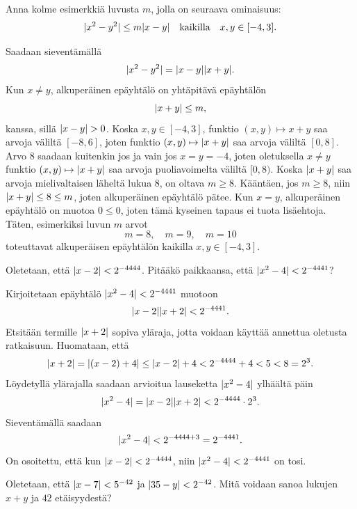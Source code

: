 \documentclass[12pt,a4paper]{article}
\begin{document}
\begin{exercise}
Anna kolme esimerkkiä luvusta \(m\), jolla on seuraava ominaisuus:
\begin{equation*}
\lvert x^2 - y^2\rvert \leq m\lvert x - y\rvert \quad \text{kaikilla} \quad x,y \in [-4, 3].
\end{equation*}
\end{exercise}

\begin{solution}
Saadaan sieventämällä
\[\lvert x^2 - y^2\rvert = \lvert x - y\rvert\lvert x + y\rvert.\]
Kun \(x \neq y\), alkuperäinen epäyhtälö on yhtäpitävä epäyhtälön
\[\lvert x + y\rvert \leq m,\]
kanssa, sillä \(\lvert x - y\rvert > 0\). Koska \(x,y \in [-4,
3]\), funktio \((x, y) \mapsto x + y\)
saa arvoja väliltä \([-8, 6]\), joten funktio
\((x, y) \mapsto \lvert x + y\rvert\) saa arvoja väliltä \([0, 8]\). Arvo \(8\)
saadaan kuitenkin jos ja vain jos \(x = y = -4\), joten oletuksella
\(x \neq y\) funktio \((x, y) \mapsto \lvert x + y\rvert\) saa arvoja puoliavoimelta
väliltä \([0, 8)\). Koska \(\lvert x + y\rvert\) saa arvoja mielivaltaisen läheltä
lukua 8, on oltava \(m \geq 8\).
Kääntäen, jos \(m \geq 8\), niin \(\lvert x + y\rvert \leq 8 \leq m\), joten
alkuperäinen epäyhtälö pätee. Kun \(x = y\), alkuperäinen epäyhtälö
on muotoa \(0 \leq 0\), joten tämä kyseinen tapaus ei tuota lisäehtoja.
Täten, esimerkiksi luvun \(m\) arvot \[m = 8, \quad m = 9, \quad m = 10\]
toteuttavat alkuperäisen epäyhtälön kaikilla \(x,y \in [-4, 3]\).
\end{solution}

\begin{exercise}
Oletetaan, että \(\lvert x - 2\rvert < 2^{-4444}\). Pitääkö paikkaansa, että
\(\lvert x^2 - 4\rvert < 2^{-4441}\)?
\end{exercise}

\begin{solution}
Kirjoitetaan epäyhtälö \(\lvert x^2 - 4\rvert < 2^{-4441}\) muotoon
\[\lvert x - 2\rvert\lvert x + 2\rvert < 2^{-4441}.\]
Etsitään termille \(\lvert x + 2\rvert\) sopiva yläraja, jotta voidaan käyttää
annettua oletusta ratkaisuun. Huomataan, että
\[\lvert x + 2\rvert = \lvert(x - 2) + 4\rvert \leq \lvert x - 2\rvert + 4 < 2^{-4444}
+ 4 < 5 < 8 = 2^3.\]
Löydetyllä ylärajalla saadaan arvioitua lauseketta \(\lvert x^2 - 4\rvert\)
ylhäältä päin
\[\lvert x^2 - 4\rvert = \lvert x - 2\rvert\lvert x + 2\rvert < 2^{-4444} \cdot 2^3.\]
Sieventämällä saadaan
\[\lvert x^2 - 4\rvert < 2^{-4444 + 3} = 2^{-4441}.\]
On osoitettu, että kun \(\lvert x - 2\rvert < 2^{-4444}\), niin
\(\lvert x^2 - 4\rvert < 2^{-4441}\) on tosi.
\end{solution}

\begin{exercise}
Oletetaan, että \(\lvert x - 7\rvert < 5^{-42}\) ja \(\lvert35 - y\rvert < 2^{-42}\).
Mitä voidaan sanoa lukujen \(x + y\) ja \(42\) etäisyydestä?
\end{exercise}
\end{document}
